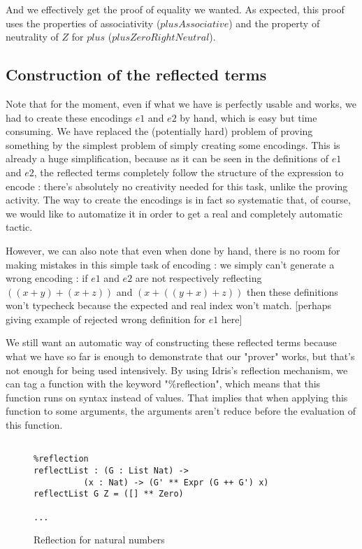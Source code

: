 And we effectively get the proof of equality we wanted. As expected, this proof uses the properties of associativity ($plusAssociative$) and the property of neutrality of $Z$ for $plus$ ($plusZeroRightNeutral$).


\subsection{Construction of the reflected terms}

Note that for the moment, even if what we have is perfectly usable and works, we had to create these encodings $e1$ and $e2$ by hand, which is easy but time consuming. We have replaced the (potentially hard) problem of proving something by the simplest problem of simply creating some encodings. This is already a huge simplification, because as it can be seen in the definitions of $e1$ and $e2$, the reflected terms completely follow the structure of the expression to encode : there's absolutely no creativity needed for this task, unlike the proving activity. The way to create the encodings is in fact so systematic that, of course, we would like to automatize it in order to get a real and completely automatic tactic.

However, we can also note that even when done by hand, there is no room for making mistakes in this simple task of encoding : we simply can't generate a wrong encoding : if $e1$ and $e2$ are not respectively reflecting $((x+y) + (x+z))$ and $(x + ((y + x) + z))$ then these definitions won't typecheck because the expected and real index won't match. [perhaps giving example of rejected wrong definition for $e1$ here]

We still want an automatic way of constructing these reflected terms because what we have so far is enough to demonstrate that our "prover" works, but that's not enough for being used intensively. 
By using Idris's reflection mechanism, we can tag a function with the keyword "\%reflection", which means that this function runs on syntax instead of values. That implies that when applying this function to some arguments, the arguments aren't reduce before the evaluation of this function.


\begin{figure}[H]
\figrule
\begin{center}
\begin{verbatim}

%reflection
reflectList : (G : List Nat) ->
          (x : Nat) -> (G' ** Expr (G ++ G') x)
reflectList G Z = ([] ** Zero)

...

\end{verbatim}
\end{center}
\caption{Reflection for natural numbers}
\figrule
\end{figure}





